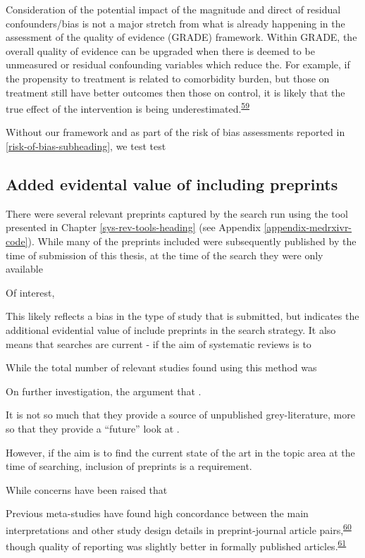 \documentclass[a4paper, twoside]{templates/ociamthesis}
\begin{document}
Consideration of the potential impact of the magnitude and direct of residual confounders/bias is not a major stretch from what is already happening in the assessment of the quality of evidence (GRADE) framework. Within GRADE, the overall quality of evidence can be upgraded when there is deemed to be unmeasured or residual confounding variables which reduce the. For example, if the propensity to treatment is related to comorbidity burden, but those on treatment still have better outcomes then those on control, it is likely that the true effect of the intervention is being underestimated.\textsuperscript{\protect\hyperlink{ref-guyatt2011}{59}}

Without our framework and as part of the risk of bias assessments reported in \ref{risk-of-bias-subheading}, we test test

\hypertarget{added-evidental-value-of-including-preprints}{%
\subsection{Added evidental value of including preprints}\label{added-evidental-value-of-including-preprints}}

There were several relevant preprints captured by the search run using the tool presented in Chapter \ref{sys-rev-tools-heading} (see Appendix \ref{appendix-medrxivr-code}). While many of the preprints included were subsequently published by the time of submission of this thesis, at the time of the search they were only available

Of interest,

This likely reflects a bias in the type of study that is submitted, but indicates the additional evidential value of include preprints in the search strategy. It also means that searches are current - if the aim of systematic reviews is to

While the total number of relevant studies found using this method was

On further investigation, the argument that .

It is not so much that they provide a source of unpublished grey-literature, more so that they provide a ``future'' look at .

However, if the aim is to find the current state of the art in the topic area at the time of searching, inclusion of preprints is a requirement.

While concerns have been raised that

Previous meta-studies have found high concordance between the main interpretations and other study design details in preprint-journal article pairs,\textsuperscript{\protect\hyperlink{ref-shi2021}{60}} though quality of reporting was slightly better in formally published articles.\textsuperscript{\protect\hyperlink{ref-carneiro2020}{61}}
\end{document}

